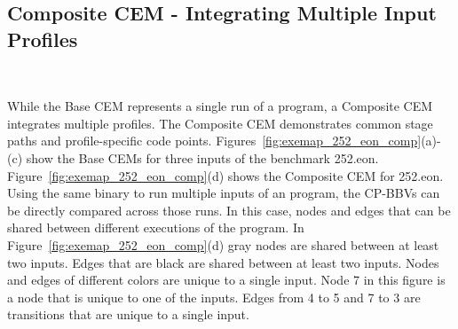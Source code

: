 \subsection{Composite CEM - Integrating Multiple Input Profiles}~\label{sec:meth_multi-input}

While the Base CEM represents a single run of a program, a Composite
CEM integrates multiple profiles. The Composite CEM demonstrates
common stage paths and profile-specific code
points. Figures~\ref{fig:exemap_252_eon_comp}(a)-(c) show the Base
CEMs for three inputs of the benchmark
252.eon. Figure~\ref{fig:exemap_252_eon_comp}(d) shows the Composite
CEM for 252.eon. Using the same binary to run multiple inputs of an
program, the CP-BBVs can be directly compared across those runs. In
this case, nodes and edges that can be shared between different
executions of the program. In Figure~\ref{fig:exemap_252_eon_comp}(d)
gray nodes are shared between at least two inputs. Edges that
are black are shared between at least two inputs. Nodes and edges of different
colors are unique to a single input. Node 7 in this
figure is a node that is unique to one of the inputs. Edges from 4 to 5 and 7 to
3 are transitions that are unique to a single input.


